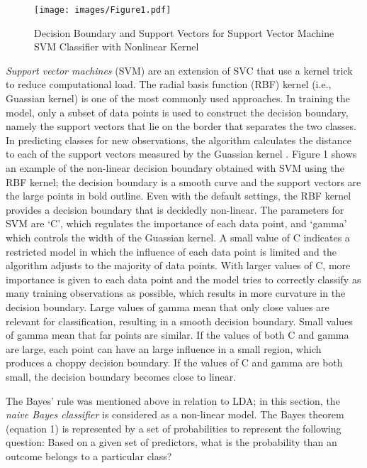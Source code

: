 \documentclass[sigconf]{acmart}
\begin{document}
\begin{figure}[!ht]
  \centering\texttt{[image: images/Figure1.pdf]}
  \caption{Decision Boundary and Support Vectors for Support Vector Machine 
  SVM Classifier with Nonlinear Kernel \cite{muller17}}
  \label{f:Figure1}
\end{figure}

\emph{Support vector machines} (SVM) are an extension of SVC that use a 
kernel trick to reduce computational load. The radial basis function (RBF) 
kernel (i.e., Guassian kernel) is one of the most commonly used approaches. 
In training the model, only a subset of data points is used to construct the 
decision boundary, namely the support vectors that lie on the border that 
separates the two classes. In predicting classes for new observations, the 
algorithm calculates the distance to each of the support vectors measured 
by the Guassian kernel \cite{muller17}. Figure 1 shows an example of the 
non-linear decision boundary obtained with SVM using the RBF kernel; the 
decision boundary is a smooth curve and the support vectors are the large 
points in bold outline. Even with the default settings, the RBF kernel 
provides a decision boundary that is decidedly non-linear. The parameters 
for SVM are `C', which regulates the importance of each data point, and 
`gamma' which controls the width of the Guassian kernel. A small value of 
C indicates a restricted model in which the influence of each data point is 
limited and the algorithm adjusts to the majority of data points. With larger 
values of C, more importance is given to each data point and the model tries 
to correctly classify as many training observations as possible, which results 
in more curvature in the decision boundary. Large values of gamma mean that 
only close values are relevant for classification, resulting in a smooth 
decision boundary. Small values of gamma mean that far points are similar. 
If the values of both C and gamma are large, each point can have an large 
influence in a small region, which produces a choppy decision boundary. 
If the values of C and gamma are both small, the decision boundary becomes 
close to linear.


The Bayes' rule was mentioned above in relation to LDA; in this section, the 
\emph{naive Bayes classifier} is considered as a non-linear model.
The Bayes theorem (equation 1) is represented by a set of probabilities to 
represent the following question: Based on a given set of predictors, what
is the probability than an outcome belongs to a particular class?
\end{document}
